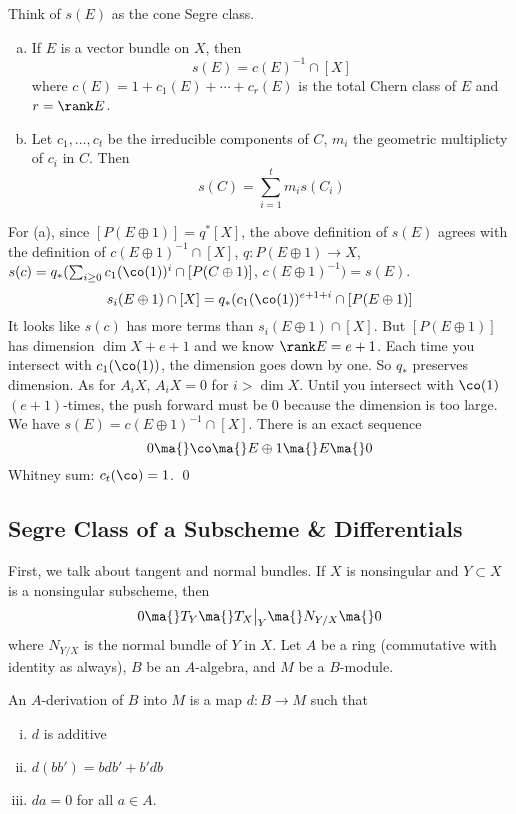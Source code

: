 Think of $s(E)$ as the cone Segre class. 

\begin{prop} \hfill
\begin{enumerate}[(a)]
\item If $E$ is a vector bundle on $X$, then
	\[
	s(E)= c(E)^{-1} \cap [X]
	\]
where $c(E)=1+c_1(E)+\cdots+c_r(E)$ is the total Chern class of $E$ and $r=\rank E$.
\item Let $c_1,\ldots,c_t$ be the irreducible components of $C$, $m_i$ the geometric multiplicty of $c_i$ in $C$. Then
	\[
	s(C)= \sum_{i=1}^t m_i s(C_i)
	\]
\end{enumerate}
\end{prop}

\pf For (a), since $[P(E \oplus 1)]=q^*[X]$, the above definition of $s(E)$ agrees with the definition of $c(E \oplus 1)^{-1} \cap [X]$, $q: P(E \oplus 1) \to X$, $s(c)=q_*(\sum_{i \geq 0} c_1(\co(1))^i \cap [P(C \oplus 1)]$, $c(E \oplus 1)^{-1})=s(E)$.
	\[
	s_i(E \oplus 1) \cap [X]= q_*(c_1(\co(1))^{e+1+i} \cap [P(E \oplus 1)]
	\]
It looks like $s(c)$ has more terms than $s_i(E\oplus 1) \cap [X]$. But $[P(E \oplus 1)]$ has dimension $\dim X+e+1$ and we know $\rank E=e+1$. Each time you intersect with $c_1(\co(1))$, the dimension goes down by one. So $q_*$ preserves dimension. As for $A_iX$, $A_iX=0$ for $i>\dim X$. Until you intersect with $\co(1)$ $(e+1)$-times, the push forward must be 0 because the dimension is too large. We have $s(E)=c(E \oplus 1)^{-1} \cap [X]$. There is an exact sequence
	\[
	0 \ma{} \co \ma{} E \oplus 1 \ma{} E \ma{} 0
	\]
Whitney sum: $c_t(\co)=1$. \qed \\


\subsection{Segre Class of a Subscheme \& Differentials}


First, we talk about tangent and normal bundles. If $X$ is nonsingular and $Y \subset X$ is a nonsingular subscheme, then
	\[
	0 \ma{} T_Y \ma{} T_X\big|_Y \ma{} N_{Y/X} \ma{} 0
	\]
where $N_{Y/X}$ is the normal bundle of $Y$ in $X$. Let $A$ be a ring (commutative with identity as always), $B$ be an $A$-algebra, and $M$ be a $B$-module. 

\begin{dfn}[Derivation]
An $A$-derivation of $B$ into $M$ is a map $d: B \to M$ such that 
\begin{enumerate}[(i)]
\item $d$ is additive
\item $d(bb')= bdb'+b'db$
\item $da=0$ for all $a \in A$.
\end{enumerate}
\end{dfn}

